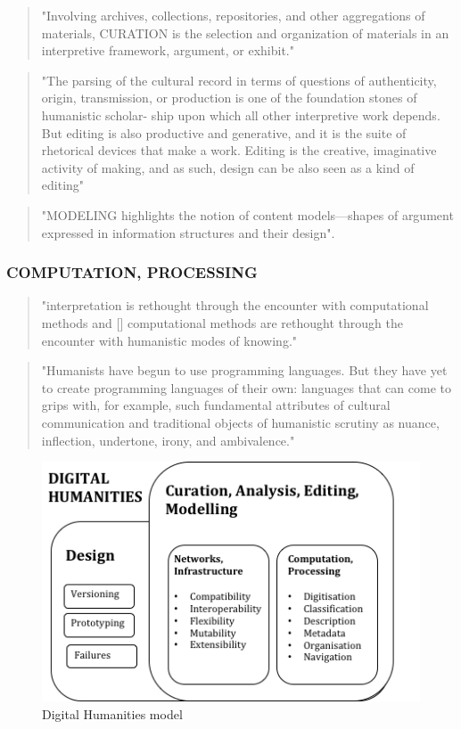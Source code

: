 \begin{quote}
"Involving archives, collections, repositories, and other aggregations of materials, CURATION is the selection and organization of materials in an interpretive framework, argument, or exhibit." \citep[p.17]{Burdick2012}
\end{quote}

\begin{quote}
"The parsing of the cultural record in terms of questions of authenticity, origin, transmission, or production is one of the foundation stones of humanistic scholar- ship upon which all other interpretive work depends. But editing is also productive and generative, and it is the suite of rhetorical devices that make a work. Editing is the creative, imaginative activity of making, and as such, design can be also seen as a kind of editing" \citep[p.18]{Burdick2012}
\end{quote}

\begin{quote}
"MODELING highlights the notion of content models—shapes of argument expressed in information structures and their design". \citep[p.18]{Burdick2012}
\end{quote}

\subsubsection{COMPUTATION, PROCESSING}
\begin{quote}
"interpretation is rethought through the encounter with computational methods and [] computational methods are rethought through the encounter with humanistic modes of knowing." \citep[p.103]{Burdick2012}
\end{quote}

\begin{quote}
"Humanists have begun to use programming languages. But they have yet to create programming languages of their own: languages that can come to grips with, for example, such fundamental attributes of cultural communication and traditional objects of humanistic scrutiny as nuance, inflection, undertone, irony, and ambivalence." \citep[p.103]{Burdick2012}
\end{quote}

\begin{figure}[!htbp]
  \centering
    \includegraphics{images/dh.png}
  \caption[Digital Humanities]{Digital Humanities model}
  \label{fig:Digital_Humanities}
\end{figure}

